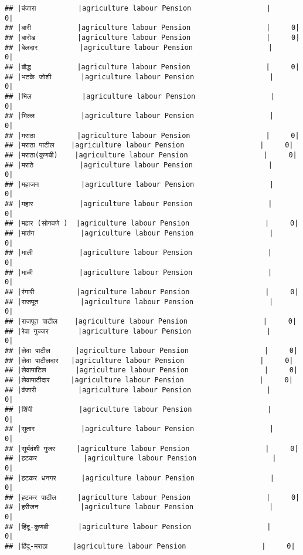 \documentclass[
]{article}
\begin{document}
\begin{verbatim}
## |बंजारा          |agriculture labour Pension                  |     0|
## |बारी           |agriculture labour Pension                  |     0|
## |बारोड          |agriculture labour Pension                  |     0|
## |बेलदार          |agriculture labour Pension                  |     0|
## |बौद्ध           |agriculture labour Pension                  |     0|
## |भटके जोशी       |agriculture labour Pension                  |     0|
## |भिल            |agriculture labour Pension                  |     0|
## |भिल्ल           |agriculture labour Pension                  |     0|
## |मराठा          |agriculture labour Pension                  |     0|
## |मराठा पाटील    |agriculture labour Pension                  |     0|
## |मराठा(कुणबी)    |agriculture labour Pension                  |     0|
## |मराठे           |agriculture labour Pension                  |     0|
## |महाजन          |agriculture labour Pension                  |     0|
## |महार           |agriculture labour Pension                  |     0|
## |महार (सोनवणे )  |agriculture labour Pension                  |     0|
## |मातंग           |agriculture labour Pension                  |     0|
## |माली           |agriculture labour Pension                  |     0|
## |माळी           |agriculture labour Pension                  |     0|
## |रंगारी          |agriculture labour Pension                  |     0|
## |राजपूत          |agriculture labour Pension                  |     0|
## |राजपूत पाटील    |agriculture labour Pension                  |     0|
## |रेवा गुज्जर       |agriculture labour Pension                  |     0|
## |लेवा पाटील      |agriculture labour Pension                  |     0|
## |लेवा पाटीलदार   |agriculture labour Pension                  |     0|
## |लेवापाटिल       |agriculture labour Pension                  |     0|
## |लेवापाटीदार     |agriculture labour Pension                  |     0|
## |वंजारी          |agriculture labour Pension                  |     0|
## |शिंपी           |agriculture labour Pension                  |     0|
## |सुतार           |agriculture labour Pension                  |     0|
## |सूर्यवंशी गुजर     |agriculture labour Pension                  |     0|
## |हटकर           |agriculture labour Pension                  |     0|
## |हटकर धनगर      |agriculture labour Pension                  |     0|
## |हटकर पाटील     |agriculture labour Pension                  |     0|
## |हरीजन          |agriculture labour Pension                  |     0|
## |हिंदू-कुणबी       |agriculture labour Pension                  |     0|
## |हिंदू-मराठा      |agriculture labour Pension                  |     0|

\end{verbatim}
\end{document}
